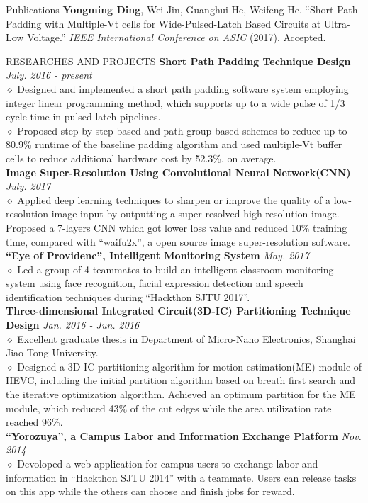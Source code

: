 \documentclass{resume} %
\begin{document}
\begin{rSection}{Publications}
\textbf{Yongming Ding}, Wei Jin, Guanghui He, Weifeng He. ``Short Path Padding with Multiple-Vt cells for Wide-Pulsed-Latch Based Circuits at Ultra-Low Voltage.'' \emph{IEEE International Conference on ASIC}  (2017). Accepted.
\end{rSection}

\begin{rSection}{RESEARCHES AND PROJECTS}
\textbf{Short Path Padding Technique Design} \hfill \emph{July. 2016 - present}
\\$\diamond$ Designed and implemented a short path padding software system employing integer linear programming method, which supports up to a wide pulse of 1/3 cycle time in pulsed-latch pipelines.
\\$\diamond$ Proposed step-by-step based and path group based schemes to reduce up to 80.9\% runtime of the baseline padding algorithm and used multiple-Vt buffer cells to reduce additional hardware cost by 52.3\%, on average. 
\\\textbf{Image Super-Resolution Using Convolutional Neural Network(CNN)} \hfill \emph{July. 2017}
\\$\diamond$  Applied deep learning techniques to sharpen or improve the quality of a low-resolution image input by outputting a super-resolved high-resolution image. Proposed a 7-layers CNN which got lower loss value and reduced 10\% training time, compared with ``waifu2x'', a open source image super-resolution software.
\\\textbf{``Eye of Providenc'', Intelligent Monitoring System} \hfill \emph{May. 2017}
\\$\diamond$ Led a group of 4 teammates to build an intelligent classroom monitoring system using face recognition, facial expression detection and speech identification techniques during ``Hackthon SJTU 2017''.
\\\textbf{Three-dimensional Integrated Circuit(3D-IC) Partitioning Technique Design} \hfill \emph{Jan. 2016 - Jun. 2016}
\\$\diamond$ Excellent graduate thesis in Department of Micro-Nano Electronics, Shanghai Jiao Tong University.
\\$\diamond$ Designed a 3D-IC partitioning algorithm for motion estimation(ME) module of HEVC, including the initial partition algorithm based on breath first search and the iterative optimization algorithm. Achieved an optimum partition for the ME module, which reduced 43\% of the cut edges while the area utilization rate reached 96\%.
\\\textbf{``Yorozuya'', a Campus Labor and Information Exchange Platform} \hfill \emph{Nov. 2014}
\\$\diamond$  Devoloped a web application for campus users to exchange labor and information in ``Hackthon SJTU 2014'' with a teammate. Users can release tasks on this app while the others can choose and finish jobs for reward.
\end{rSection}
\end{document}
